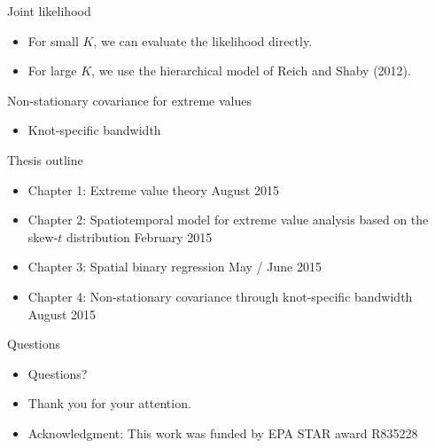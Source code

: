 \documentclass{beamer}
\begin{document}
\begin{frame}{Joint likelihood}
  \begin{itemize} \setlength{\itemsep}{0.5em}
    \item For small $K$, we can evaluate the likelihood directly.
    \item For large $K$, we use the hierarchical model of Reich and Shaby (2012).
  \end{itemize}
\end{frame}

\begin{frame}{Non-stationary covariance for extreme values}
  \begin{itemize} \setlength{\itemsep}{0.5em}
    \item Knot-specific bandwidth
  \end{itemize}
\end{frame}


\begin{frame}{Thesis outline}
  \begin{itemize} \setlength{\itemsep}{0.5em}
    \item Chapter 1: Extreme value theory \alert{August 2015}
    \item Chapter 2: Spatiotemporal model for extreme value analysis based on the skew-$t$ distribution \alert{February 2015}
    \item Chapter 3: Spatial binary regression \alert{May / June 2015}
    \item Chapter 4: Non-stationary covariance through knot-specific bandwidth \alert{August 2015}
  \end{itemize}
\end{frame}

\begin{frame}{Questions}
  \begin{itemize} \setlength{\itemsep}{0.5em}
    \item Questions?
    \item Thank you for your attention.
    \item Acknowledgment: This work was funded by EPA STAR award R835228
  \end{itemize}
\end{frame}
\end{document}
